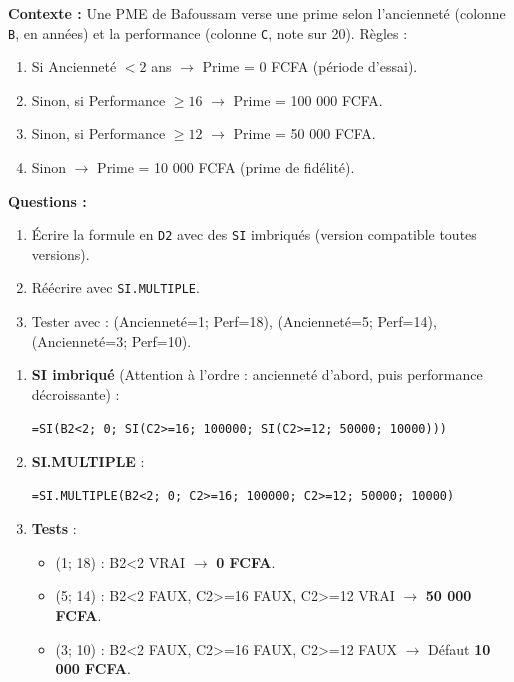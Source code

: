 \documentclass[11pt]{article}
\begin{document}
\begin{exercice}
\textbf{Contexte :} Une PME de Bafoussam verse une prime selon l'ancienneté (colonne \texttt{B}, en années) et la performance (colonne \texttt{C}, note sur 20).
Règles :
\begin{enumerate}
    \item Si Ancienneté $< 2$ ans $\to$ Prime = 0 FCFA (période d'essai).
    \item Sinon, si Performance $\ge 16$ $\to$ Prime = 100 000 FCFA.
    \item Sinon, si Performance $\ge 12$ $\to$ Prime = 50 000 FCFA.
    \item Sinon $\to$ Prime = 10 000 FCFA (prime de fidélité).
\end{enumerate}
\textbf{Questions :}
\begin{enumerate}
    \item Écrire la formule en \texttt{D2} avec des \texttt{SI} imbriqués (version compatible toutes versions).
    \item Réécrire avec \texttt{SI.MULTIPLE}.
    \item Tester avec : (Ancienneté=1; Perf=18), (Ancienneté=5; Perf=14), (Ancienneté=3; Perf=10).
\end{enumerate}
\end{exercice}

\begin{corrige}
\begin{enumerate}
    \item \textbf{SI imbriqué} (Attention à l'ordre : ancienneté d'abord, puis performance décroissante) :
\begin{lstlisting}
=SI(B2<2; 0; SI(C2>=16; 100000; SI(C2>=12; 50000; 10000)))
\end{lstlisting}
    \item \textbf{SI.MULTIPLE} :
\begin{lstlisting}
=SI.MULTIPLE(B2<2; 0; C2>=16; 100000; C2>=12; 50000; 10000)
\end{lstlisting}
    \item \textbf{Tests} :
    \begin{itemize}
        \item (1; 18) : B2<2 VRAI $\to$ \textbf{0 FCFA}.
        \item (5; 14) : B2<2 FAUX, C2>=16 FAUX, C2>=12 VRAI $\to$ \textbf{50 000 FCFA}.
        \item (3; 10) : B2<2 FAUX, C2>=16 FAUX, C2>=12 FAUX $\to$ Défaut \textbf{10 000 FCFA}.
    \end{itemize}
\end{enumerate}
\end{corrige}
\end{document}
